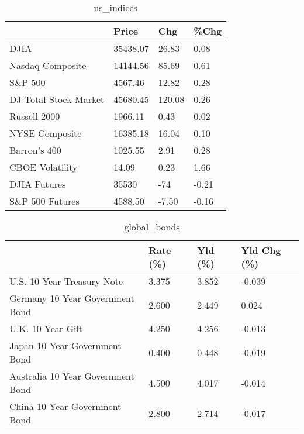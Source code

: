 \documentclass{article}%
\begin{document}
%


\begin{table}[htbp]%
\caption{us\_indices}%
\centering%
\begin{adjustbox}{width=1\textwidth}%
\begin{tabular}{llll}
\toprule
                      &    Price &    Chg &  \%Chg \\
\midrule
                 DJIA & 35438.07 &  26.83 &  0.08 \\
     Nasdaq Composite & 14144.56 &  85.69 &  0.61 \\
              S\&P 500 &  4567.46 &  12.82 &  0.28 \\
DJ Total Stock Market & 45680.45 & 120.08 &  0.26 \\
         Russell 2000 &  1966.11 &   0.43 &  0.02 \\
       NYSE Composite & 16385.18 &  16.04 &  0.10 \\
         Barron's 400 &  1025.55 &   2.91 &  0.28 \\
      CBOE Volatility &    14.09 &   0.23 &  1.66 \\
         DJIA Futures &    35530 &    -74 & -0.21 \\
      S\&P 500 Futures &  4588.50 &  -7.50 & -0.16 \\
\bottomrule
\end{tabular}
%
\end{adjustbox}%
\end{table}

%


\begin{table}[htbp]%
\caption{global\_bonds}%
\centering%
\begin{adjustbox}{width=1\textwidth}%
\begin{tabular}{llll}
\toprule
                                  & Rate (\%) & Yld (\%) & Yld Chg (\%) \\
\midrule
       U.S. 10 Year Treasury Note &    3.375 &   3.852 &      -0.039 \\
  Germany 10 Year Government Bond &    2.600 &   2.449 &       0.024 \\
                U.K. 10 Year Gilt &    4.250 &   4.256 &      -0.013 \\
    Japan 10 Year Government Bond &    0.400 &   0.448 &      -0.019 \\
Australia 10 Year Government Bond &    4.500 &   4.017 &      -0.014 \\
    China 10 Year Government Bond &    2.800 &   2.714 &      -0.017 \\
\bottomrule
\end{tabular}
%
\end{adjustbox}%
\end{table}
\end{document}

